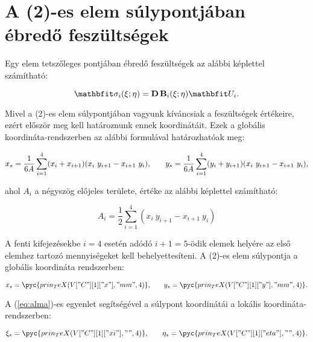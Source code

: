\section{A (2)-es elem súlypontjában ébredő feszültségek}

Egy elem tetszőleges pontjában ébredő feszültségek az alábbi képlettel
számítható:
\begin{myframe}
  \begin{equation}
    \rvec \sigma_i(\xi; \eta)
    = \rmat D \, \rmat B_i(\xi; \eta) \rvec U_i
    \text.
  \end{equation}
\end{myframe}
Mivel a (2)-es elem súlypontjában vagyunk kíváncsiak a feszültségek értékeire,
ezért először meg kell határoznunk ennek koordinátáit. Ezek a globális
koordináta-rendszerben az alábbi formulával határozhatóak meg:
\begin{myframe}
  \begin{equation}
    x_s = \frac{1}{6A}\sum _{i=1}^{4}(x_{i}+x_{i+1})(x_{i}\ y_{i+1}-x_{i+1}\ y_{i})
    \text,
    \qquad
    y_s = \frac{1}{6A}\sum _{i=1}^{4}(y_{i}+y_{i+1})(x_{i}\ y_{i+1}-x_{i+1}\ y_{i})
    \text,
  \end{equation}
\end{myframe}
ahol $A_i$ a négyszög előjeles területe, értéke az alábbi képlettel számítható:
\begin{myframe}
  \begin{equation}
    A_i = \frac{1}{2}\sum _{i=1}^{4}(x_{i}\ y_{i+1}-x_{i+1}\ y_{i})
  \end{equation}
\end{myframe}
A fenti kifejezésekbe $i=4$ esetén adódó $i + 1 = 5$-ödik elemek helyére az
első elemhez tartozó mennyiségeket kell behelyettesíteni. A (2)-es elem
súlypontja a globális koordináta rendszerben:
\begin{myframe}
  \begin{equation}
    x_s = \pyc{prin_TeX(V["C"][1]["x"], "mm", 4)}
    \text,
    \qquad
    y_s = \pyc{prin_TeX(V["C"][1]["y"], "mm", 4)}
    \text.
  \end{equation}
\end{myframe}
A (\ref{eq:alma})-es egyenlet segítségével a súlypont koordinátái a lokális
koordináta-rendszerben:
\begin{myframe}
  \begin{equation}
    \sisetup{drop-zero-decimal}
    \xi_s = \pyc{prin_TeX(V["C"][1]["xi"], "", 4)}
    \text,
    \qquad
    \eta_s = \pyc{prin_TeX(V["C"][1]["eta"], "", 4)}
    \text.
  \end{equation}
\end{myframe}
